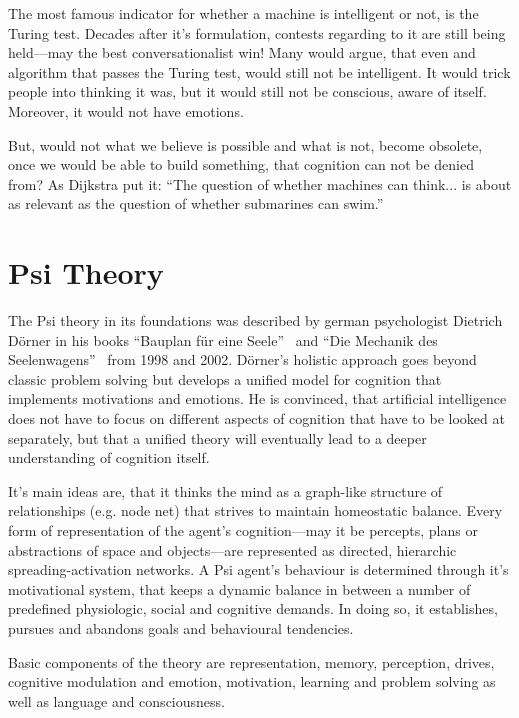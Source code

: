 The most famous indicator for whether a machine is intelligent or not, is the Turing test. Decades after it's formulation, contests regarding to it are still being held---may the best conversationalist win! Many would argue, that even and algorithm that passes the Turing test, would still not be intelligent. It would trick people into thinking it was, but it would still not be conscious, aware of itself. Moreover, it would not have emotions.~\cite{russell2009artificial}

But, would not what we believe is possible and what is not, become obsolete, once we would be able to build something, that cognition can not be denied from? As Dijkstra put it: ``The question of whether machines can think... is about as relevant as the question of whether submarines can swim.''

\section{Psi Theory}
The Psi theory in its foundations was described by german psychologist Dietrich Dörner in his books ``Bauplan für eine Seele''~\cite{Doerner1998} and ``Die Mechanik des Seelenwagens''~\cite{dorner2002mechanik} from 1998 and 2002. Dörner's holistic approach goes beyond classic problem solving but develops a unified model for cognition that implements motivations and emotions. He is convinced, that artificial intelligence does not have to focus on different aspects of cognition that have to be looked at separately, but that a unified theory will eventually lead to a deeper understanding of cognition itself.

It's main ideas are, that it thinks the mind as a graph-like structure of relationships (e.g. node net) that strives to maintain homeostatic balance. Every form of representation of the agent's cognition---may it be percepts, plans or abstractions of space and objects---are represented as directed, hierarchic spreading-activation networks. A Psi agent's behaviour is determined through it's motivational system, that keeps a dynamic balance in between a number of predefined physiologic, social and cognitive demands. In doing so, it establishes, pursues and abandons goals and behavioural tendencies.\cite{Bach:2009:PSI:1611304}

Basic components of the theory are representation, memory, perception, drives, cognitive modulation and emotion, motivation, learning and problem solving as well as language and consciousness. %

